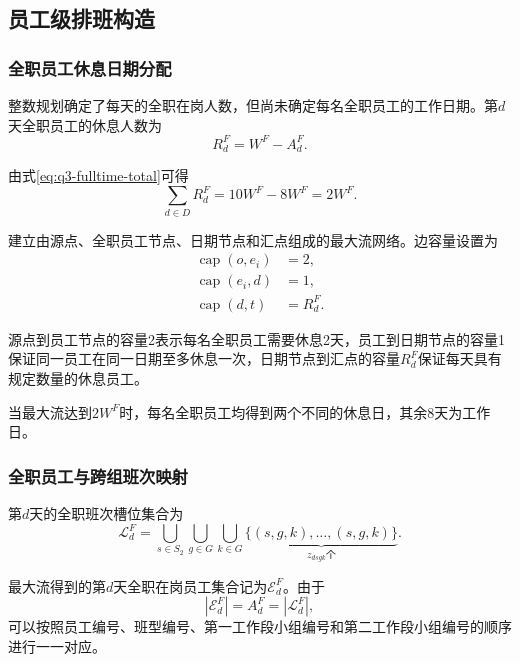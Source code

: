 \documentclass[withoutpreface,bwprint]{cumcmthesis}
\begin{document}
\subsection{员工级排班构造}

\subsubsection{全职员工休息日期分配}

整数规划确定了每天的全职在岗人数，但尚未确定每名全职员工的工作日期。第$d$天全职员工的休息人数为
\begin{equation}
R_d^F=W^F-A_d^F.
\label{eq:q3-fulltime-rest}
\end{equation}

由式\eqref{eq:q3-fulltime-total}可得
\begin{equation}
\sum_{d\in D}R_d^F
=
10W^F-8W^F
=
2W^F.
\label{eq:q3-fulltime-rest-total}
\end{equation}

建立由源点、全职员工节点、日期节点和汇点组成的最大流网络。边容量设置为
\begin{equation}
\begin{aligned}
\operatorname{cap}(o,e_i)&=2,\\
\operatorname{cap}(e_i,d)&=1,\\
\operatorname{cap}(d,t)&=R_d^F.
\end{aligned}
\label{eq:q3-flow-capacity}
\end{equation}

源点到员工节点的容量2表示每名全职员工需要休息2天，员工到日期节点的容量1保证同一员工在同一日期至多休息一次，日期节点到汇点的容量$R_d^F$保证每天具有规定数量的休息员工。

当最大流达到$2W^F$时，每名全职员工均得到两个不同的休息日，其余8天为工作日。

\subsubsection{全职员工与跨组班次映射}

第$d$天的全职班次槽位集合为
\begin{equation}
\mathcal L_d^F
=
\bigcup_{s\in S_2}
\bigcup_{g\in G}
\bigcup_{k\in G}
\underbrace{
\{(s,g,k),\ldots,(s,g,k)\}
}_{z_{dsgk}\text{个}}.
\label{eq:q3-fulltime-slot}
\end{equation}

最大流得到的第$d$天全职在岗员工集合记为$\mathcal E_d^F$。由于
\begin{equation}
|\mathcal E_d^F|
=
A_d^F
=
|\mathcal L_d^F|,
\end{equation}
可以按照员工编号、班型编号、第一工作段小组编号和第二工作段小组编号的顺序进行一一对应。
\end{document}
